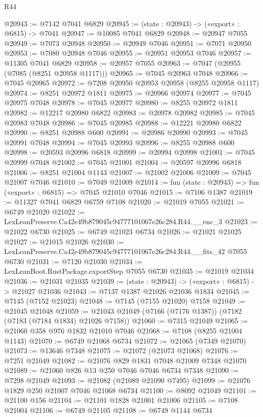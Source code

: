 \begin{lexlean}{R44}
\begin{coremodule}
{@20943 := @7142 @7041 @6829
@20945 := (state : @20943) -> («export» : @6815) -> @7041
@20947 := @10085 @7041 @6829
@20948 := @20947 @7055
@20949 := @7073 @20948
@20950 := @20949 @7046
@20951 := @7071 @20950
@20953 := @7080 @20948 @7046
@20955 := @20951 @20953 @7046
@20957 := @11305 @7041 @6829
@20958 := @20957 @7055
@20963 := @7047 (@20955 (@7085 (@8251 @20958 @1117)))
@20965 := @7045 @20963 @7048
@20966 := @7045 @20965
@20972 := @7208 @20950 @20953 @20958 (@8255 @20958 @1117)
@20974 := @8251 @20972 @1811
@20975 := @20966 @20974
@20977 := @7045 @20975 @7048
@20978 := @7045 @20977
@20980 := @8255 @20972 @1811
@20982 := @12217 @20980 @6822
@20983 := @20978 @20982
@20985 := @7045 @20983 @7048
@20986 := @7045 @20985
@20988 := @12221 @20980 @6822
@20990 := @8251 @20988 @600
@20991 := @20986 @20990
@20993 := @7045 @20991 @7048
@20994 := @7045 @20993
@20996 := @8255 @20988 @600
@20998 := @20593 @20996 @6818
@20999 := @20994 @20998
@21001 := @7045 @20999 @7048
@21002 := @7045 @21001
@21004 := @20597 @20996 @6818
@21006 := @8251 @21004 @1143
@21007 := @21002 @21006
@21009 := @7045 @21007 @7046
@21010 := @7049 @21009
@21014 := fun (state : @20943) => fun («export» : @6815) => @7045 @21010 @7046
@21015 := @7106 @1387
@21019 := @11327 @7041 @6829 @6759 @7108
@21020 := @21019 @7055
@21021 := @6749 @21020
@21022 := LexLeanPreserve.Ca42e49b879045c94777101067e26c284.R44.__enc_3
@21023 := @21022 @6730
@21025 := @6749 @21023 @6734
@21026 := @21021 @21025
@21027 := @21015 @21026
@21030 := LexLeanPreserve.Ca42e49b879045c94777101067e26c284.R44.__fits_42 @7055 @6730
@21031 := @7120 @21030
@21034 := LexLeanBoot.RustPackage.exportStep @7055 @6730
@21035 := @21019 @21034
@21036 := @21031 @21035
@21039 := (state : @20943) -> («export» : @6815) -> @21027 @21036
@21043 := @7137 @1387 @21026 @21036 @1834
@21045 := @7145 (@7152 @21023)
@21048 := @7145 (@7155 @21020) @7158
@21049 := @21045 @21048
@21059 := @21043 @21049 (@7166 (@7176 @1387)) (@7182 (@7183 (@7184 @1834) @21026 @7158))
@21060 := @7315 @21049
@21065 := @21060 @358 @976 @1832 @21010 @7046
@21068 := @7108 (@8255 @21004 @1143)
@21070 := @6749 @21068 @6734
@21072 := @21065 (@7349 @21070)
@21073 := @13646 @7348
@21075 := @21072 (@21073 @21068)
@21076 := @7251 @21049
@21082 := @21076 @829 @1831 @7048 @21009 @7348 @21070
@21089 := @21060 @826 @13 @250 @7046 @7046 @6734 @7348
@21090 := @7298 @21049
@21093 := @21082 (@21089 @21090 @7495)
@21099 := @21076 @1829 @250 @21007 @7046 @21068 @6734
@21100 := @8092 @21049
@21101 := @21100 @156
@21104 := @21101 @1828 @21001 @21006
@21105 := @7108 @21004
@21106 := @6749 @21105
@21108 := @6749 @1144 @6734
}
\end{coremodule}
\end{lexlean}

